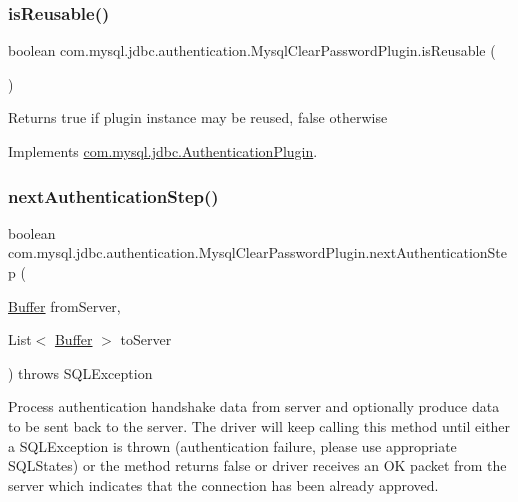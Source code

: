 \subsubsection{\texorpdfstring{is\+Reusable()}{isReusable()}}
{\footnotesize\ttfamily boolean com.\+mysql.\+jdbc.\+authentication.\+Mysql\+Clear\+Password\+Plugin.\+is\+Reusable (\begin{DoxyParamCaption}{ }\end{DoxyParamCaption})}

\begin{DoxyReturn}{Returns}
true if plugin instance may be reused, false otherwise 
\end{DoxyReturn}


Implements \mbox{\hyperlink{interfacecom_1_1mysql_1_1jdbc_1_1_authentication_plugin_abf6de7affb05904b1dba5517a17421d1}{com.\+mysql.\+jdbc.\+Authentication\+Plugin}}.

\mbox{\label{classcom_1_1mysql_1_1jdbc_1_1authentication_1_1_mysql_clear_password_plugin_afe852978e8b5462d13f6f60bc8d7d6be}} 
\subsubsection{\texorpdfstring{next\+Authentication\+Step()}{nextAuthenticationStep()}}
{\footnotesize\ttfamily boolean com.\+mysql.\+jdbc.\+authentication.\+Mysql\+Clear\+Password\+Plugin.\+next\+Authentication\+Step (\begin{DoxyParamCaption}\item[{\mbox{\hyperlink{classcom_1_1mysql_1_1jdbc_1_1_buffer}{Buffer}}}]{from\+Server,  }\item[{List$<$ \mbox{\hyperlink{classcom_1_1mysql_1_1jdbc_1_1_buffer}{Buffer}} $>$}]{to\+Server }\end{DoxyParamCaption}) throws S\+Q\+L\+Exception}

Process authentication handshake data from server and optionally produce data to be sent back to the server. The driver will keep calling this method until either a S\+Q\+L\+Exception is thrown (authentication failure, please use appropriate S\+Q\+L\+States) or the method returns false or driver receives an OK packet from the server which indicates that the connection has been already approved.

